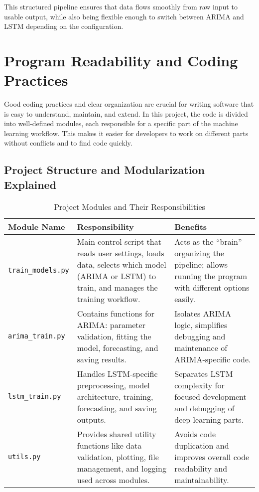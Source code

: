 This structured pipeline ensures that data flows smoothly from raw input to usable output, while also being flexible enough to switch between ARIMA and LSTM depending on the configuration.

\section{Program Readability and Coding Practices}

Good coding practices and clear organization are crucial for writing software that is easy to understand, maintain, and extend. In this project, the code is divided into well-defined modules, each responsible for a specific part of the machine learning workflow. This makes it easier for developers to work on different parts without conflicts and to find code quickly.

\subsection{Project Structure and Modularization Explained}

\begin{table}[h!]
	\centering
	\begin{tabular}{|p{3cm}|p{7cm}|p{4.5cm}|}
		\hline
		\textbf{Module Name} & \textbf{Responsibility} & \textbf{Benefits} \\ \hline
		
		\texttt{train\_models.py} &
		Main control script that reads user settings, loads data, selects which model (ARIMA or LSTM) to train, and manages the training workflow. &
		Acts as the “brain” organizing the pipeline; allows running the program with different options easily. \\ \hline
		
		\texttt{arima\_train.py} &
		Contains functions for ARIMA: parameter validation, fitting the model, forecasting, and saving results. &
		Isolates ARIMA logic, simplifies debugging and maintenance of ARIMA-specific code. \\ \hline
		
		\texttt{lstm\_train.py} &
		Handles LSTM-specific preprocessing, model architecture, training, forecasting, and saving outputs. &
		Separates LSTM complexity for focused development and debugging of deep learning parts. \\ \hline
		
		\texttt{utils.py} &
		Provides shared utility functions like data validation, plotting, file management, and logging used across modules. &
		Avoids code duplication and improves overall code readability and maintainability. \\ \hline
		
	\end{tabular}
	\caption{Project Modules and Their Responsibilities}
\end{table}

